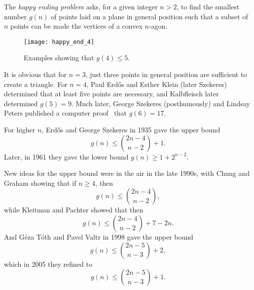 \documentclass[12pt]{article}
\begin{document}
The {\em happy ending problem} asks, for a given integer $n > 2$, to find the smallest number $g(n)$ of points laid on a plane in general position such that a subset of $n$ points can be made the vertices of a convex $n$-agon.

\begin{figure}
\texttt{[image: happy\_end\_4]}
\caption{Examples showing that $g(4)\le 5$.}
\end{figure}

It is obvious that for $n = 3$, just three points in general position
are sufficient to create a triangle. For $n = 4$, Paul Erd\H{o}s and
Esther Klein (later Szekeres) determined that at least five points are
necessary, and Kalbfleisch later determined $g(5) = 9$.  Much later,
George Szekeres (posthumously) and Lindsay Peters published a computer
proof~\cite{cite:PS2006} that $g(6) = 17$.

For higher $n$, Erd\H{o}s and George Szekeres in 1935 gave the upper bound $$g(n) \le \binom{2n - 4}{n - 2} + 1.$$ Later, in 1961 they gave the lower bound $g(n) \geq 1 + 2^{n - 2}$. 

New ideas for the upper bound were in the air in the late 1990s, with Chung and Graham showing that if $n \ge 4$, then $$g(n) \le \binom{2n - 4}{n - 2},$$ while Kleitman and Pachter showed that then $$g(n) \le \binom{2n - 4}{n - 2} + 7 - 2n.$$ And G\'eza T\'oth and Pavel Valtr in 1998 gave the upper bound $$g(n) \leq {2n - 5 \choose n - 3} + 2,$$ which in 2005 they refined to $$g(n) \le \binom{2n-5}{n-3} + 1.$$
\end{document}
